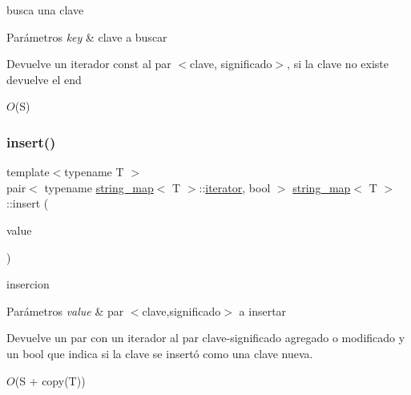 busca una clave 


\begin{DoxyParams}{Parámetros}
{\em key} & clave a buscar \\
\hline
\end{DoxyParams}
\begin{DoxyReturn}{Devuelve}
un iterador const al par $<$clave, significado$>$, si la clave no existe devuelve el end
\end{DoxyReturn}

\begin{DoxyDescription}
\item[Complejidad Temporal]$O$(S)
\end{DoxyDescription}\mbox{\label{classstring__map_a2fff1076bccd20802f03f72a92275b33}} 
\subsubsection{\texorpdfstring{insert()}{insert()}}
{\footnotesize\ttfamily template$<$typename T $>$ \\
pair$<$ typename \mbox{\hyperlink{classstring__map}{string\+\_\+map}}$<$ T $>$\+::\mbox{\hyperlink{classstring__map_1_1iterator}{iterator}}, bool $>$ \mbox{\hyperlink{classstring__map}{string\+\_\+map}}$<$ T $>$\+::insert (\begin{DoxyParamCaption}\item[{const value\+\_\+type \&}]{value }\end{DoxyParamCaption})}



insercion 


\begin{DoxyParams}{Parámetros}
{\em value} & par $<$clave,significado$>$ a insertar \\
\hline
\end{DoxyParams}
\begin{DoxyReturn}{Devuelve}
un par con un iterador al par clave-\/significado agregado o modificado y un bool que indica si la clave se insertó como una clave nueva.
\end{DoxyReturn}

\begin{DoxyDescription}
\item[Complejidad Temporal]$O$(S + copy(\+T))
\end{DoxyDescription}\mbox{\label{classstring__map_ac7db64d13d22674a2d53c8af469186fa}} 
